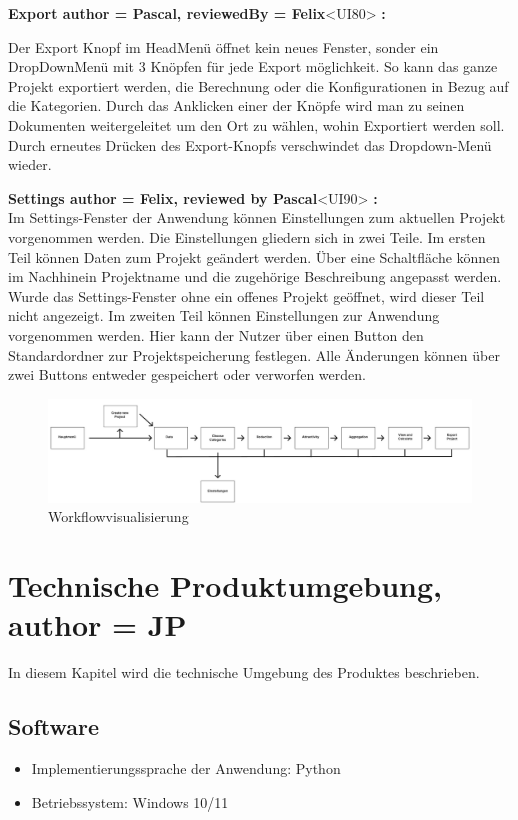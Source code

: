 \documentclass[parskip=full]{scrartcl} %
\begin{document}
\textbf{Export author = Pascal, reviewedBy = Felix}<UI80> \textbf{:}

Der Export Knopf im HeadMenü öffnet kein neues Fenster, sonder ein DropDownMenü mit 3 Knöpfen für jede Export möglichkeit. So kann das ganze Projekt exportiert werden, die Berechnung oder die Konfigurationen in Bezug auf die Kategorien. Durch das Anklicken einer der Knöpfe wird man zu seinen Dokumenten weitergeleitet um den Ort zu wählen, wohin Exportiert werden soll.
Durch erneutes Drücken des Export-Knopfs verschwindet das Dropdown-Menü wieder.

\textbf{Settings author = Felix, reviewed by Pascal}<UI90> \textbf{:}\\
Im Settings-Fenster der Anwendung können Einstellungen zum aktuellen Projekt vorgenommen werden.
Die Einstellungen gliedern sich in zwei Teile.
Im ersten Teil können Daten zum Projekt geändert werden. Über eine Schaltfläche können im Nachhinein Projektname und die zugehörige Beschreibung angepasst werden. Wurde das Settings-Fenster ohne ein offenes Projekt geöffnet, wird dieser Teil nicht angezeigt.
Im zweiten Teil können Einstellungen zur Anwendung vorgenommen werden. Hier kann der Nutzer über einen Button den Standardordner zur Projektspeicherung festlegen.
Alle Änderungen können über zwei Buttons entweder gespeichert oder verworfen werden.

\newpage

\begin{figure}
    \centering
    \includegraphics[width=1\textwidth]{pictures/WorkflowvisualisierungGUI.jpg}
    \caption{Workflowvisualisierung}
\end{figure}

\newpage



\section{Technische Produktumgebung, author = JP}
In diesem Kapitel wird die technische Umgebung des Produktes beschrieben.

\subsection{Software}
\begin{itemize}
    \item Implementierungssprache der Anwendung: Python
    \item Betriebssystem: Windows 10/11
\end{itemize}
\end{document}
